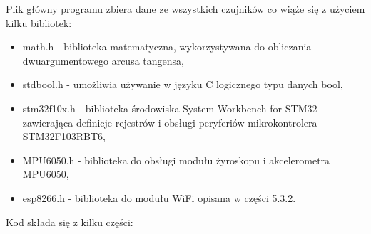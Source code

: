 \documentclass[a4paper,12pt,twoside,openany]{report}
\begin{document}
Plik główny programu zbiera dane ze wszystkich czujników co wiąże się z użyciem kilku bibliotek:
\begin{itemize}
\item math.h - biblioteka matematyczna, wykorzystywana do obliczania dwuargumentowego arcusa tangensa,
\item stdbool.h - umożliwia używanie w języku C logicznego typu danych bool,
\item stm32f10x.h - biblioteka środowiska System Workbench for STM32 zawierająca definicje rejestrów i obsługi peryferiów mikrokontrolera STM32F103RBT6,
\item MPU6050.h - biblioteka do obsługi modułu żyroskopu i akcelerometra MPU6050,
\item esp8266.h - biblioteka do modułu WiFi opisana w części 5.3.2.
\end{itemize}
Kod składa się z kilku części:
\end{document}
